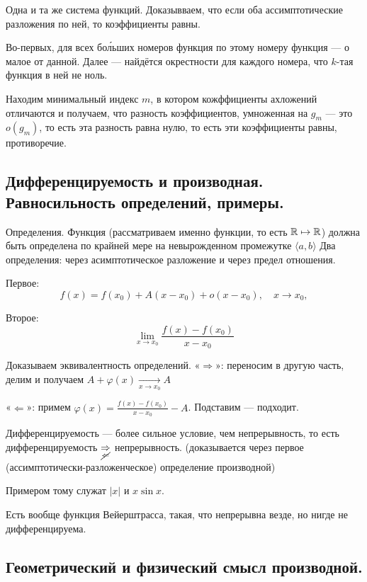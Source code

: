\documentclass[12pt, a4paper]{article}
\begin{document}
Одна и та же система функций. 
Доказывваем, что если оба ассимптотические разложения по ней, 
то коэффициенты равны.

Во-первых, для всех бо\'льших номеров функция по этому номеру функция — о малое от данной.
Далее — найдётся окрестности для каждого номера, что $k$-тая функция в ней не ноль.

Находим минимальный индекс $m$, в котором кожффициенты ахложений отличаются и получаем, 
что разность коэффициентов, умноженная на $g_m$ — это $o(g_m)$, то есть эта разность равна нулю, 
то есть эти коэффициенты равны, противоречие.


\subsection{Дифференцируемость и производная. Равносильность определений, примеры.}

Определения.
Функция (рассматриваем именно функции, то есть ${\mathbb{R}} \mapsto {\mathbb{R}}$) 
должна быть определена по крайней мере на невырожденном промежутке $\langle a, b \rangle$
Два определения: через асимптотическое разложение и через предел отношения.

Первое:
\begin{equation*}
    f(x)=f\left(x_{0}\right)+A\left(x-x_{0}\right)+o\left(x-x_{0}\right), \quad x \rightarrow x_{0},
\end{equation*}

Второе:
\begin{equation}
    \lim_{x \rightarrow x_{0}} \frac{f(x)-f\left(x_{0}\right)}{x-x_{0}}
\end{equation}

Доказываем эквивалентность определений.
«$\Rightarrow$»: переносим в другую часть, делим и получаем $A+\varphi(x) \underset{x \rightarrow x_{0}}{\longrightarrow} A$

«$\Leftarrow$»: примем $\varphi(x)=\frac{f(x)-f\left(x_{0}\right)}{x-x_{0}}-A$. Подставим — подходит.

Дифференцируемость — более сильное условие, чем непрерывность, то есть дифференцируемость $\underset{\cancel{\Leftarrow}}{\Rightarrow}$ непрерывность.
(доказывается через первое (ассимптотически-разложенческое) определение производной)

Примером тому служат $|x|$ и $x \sin x$.

Есть вообще функция Вейерштрасса, такая, что непрерывна везде, но нигде не дифференцируема.

\subsection{Геометрический и физический смысл производной.}
\end{document}
